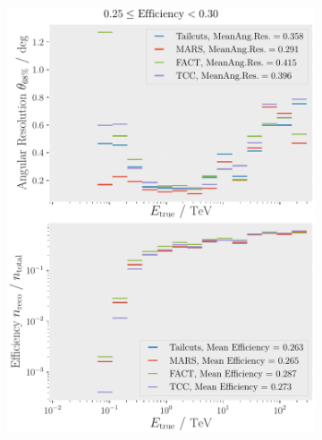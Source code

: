 \begin{figure}
    \centering
    \begin{subfigure}{0.48\textwidth}
        \centering
        \includegraphics[width=\textwidth]{plots/ar_aeff/AR_Aeff_MST_0.25_0.30.pdf}
    \end{subfigure}
    \hfill
    \begin{subfigure}{0.48\textwidth}
        \centering

\end{subfigure}
\end{figure}
